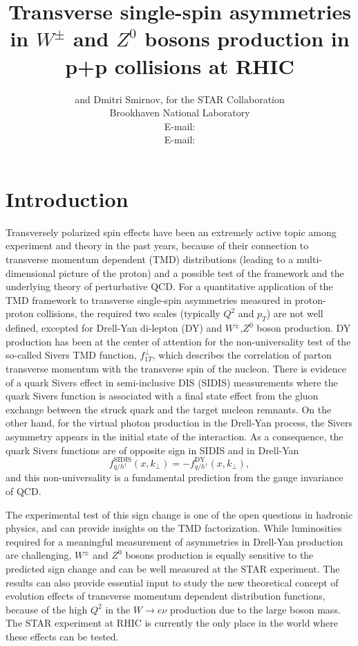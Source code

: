 \documentclass{PoS}
\title{Transverse single-spin asymmetries in $W^{\pm}$ and $Z^{0}$ bosons production in p+p collisions at RHIC}
\author{\speaker{Salvatore Fazio} and Dmitri Smirnov, for the STAR Collaboration \\ %
        Brookhaven National Laboratory\\
        E-mail: \email{sfazio@bnl.gov} \\
        E-mail: \email{dsmirnov@bnl.gov}}
\begin{document}
\section{Introduction}
Transversely polarized spin effects have been an extremely active topic among experiment and theory in the past years, because of their connection to transverse momentum dependent (TMD) distributions (leading to a multi-dimensional picture of the proton) and a possible test of the framework and the underlying theory of perturbative QCD. For a quantitative application of the TMD framework to transverse single-spin asymmetries measured in proton-proton collisions, the required two scales (typically $Q^{2}$ and $p_{T}$) are not well defined, excepted for Drell-Yan di-lepton (DY) and $W^{\pm}$,$Z^{0}$ boson production. DY production has been at the center of attention for the non-universality test of the so-called Sivers TMD function, %
$f^{\perp}_{1T}$, which describes the correlation of parton transverse momentum with the transverse spin of the nucleon.  There is evidence of a quark Sivers effect in semi-inclusive DIS (SIDIS) measurements where the quark Sivers function is associated with a final state effect from the gluon exchange between the struck quark and the target nucleon remnants. On the other hand, for the virtual photon production in the Drell-Yan process, the Sivers asymmetry appears in the initial state of the interaction. As a consequence, the quark Sivers functions are of opposite sign in SIDIS and in Drell-Yan
%
\begin{equation}
f^\text{SIDIS}_{q/h^\uparrow} (x, k_\perp) = - f^\text{DY}_{q/h^\uparrow} (x, k_\perp),
\end{equation}
 and this non-universality is a fundamental prediction from the gauge invariance of QCD. 

The experimental test of this sign change is one of the open questions in hadronic physics, and can provide insights on the TMD factorization. While luminosities required for a meaningful measurement of asymmetries in Drell-Yan production are challenging, $W^{\pm}$ and $Z^{0}$ bosons production is equally sensitive to the predicted sign change and can be well measured at the STAR experiment.  The results can also provide essential input to study the new theoretical concept of evolution effects of transverse momentum dependent distribution functions, because of the high $Q^{2}$ in the $W\rightarrow e \nu$ production due to the large boson mass. The STAR experiment at RHIC is currently the only place in the world where these effects can be tested.
\end{document}
